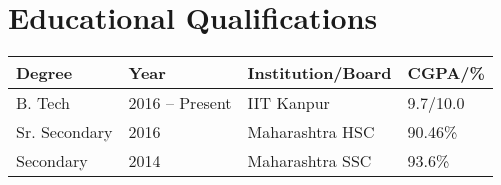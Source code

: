 \setlength\extrarowheight{3pt}  %

\section*{Educational Qualifications}
\begin{tabularx}{\textwidth}{L L L L}

\toprule
\textbf{Degree} & \textbf{Year}   & \textbf{Institution/Board} & \textbf{CGPA/\%}\\
\midrule
B. Tech         & 2016 -- Present & IIT Kanpur                 & 9.7/10.0\\%
Sr. Secondary   & 2016            & Maharashtra HSC            & 90.46\%\\
Secondary       & 2014            & Maharashtra SSC            & 93.6\%\\
\bottomrule

\end{tabularx}
